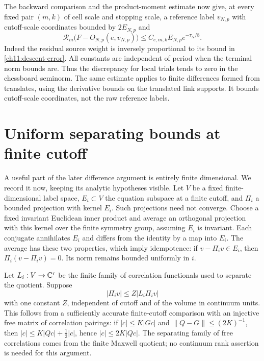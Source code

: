The backward comparison and the product-moment estimate now give, at every fixed
pair $(m,k)$ of cell scale and stopping scale, a reference label $v_{N,p}$ with cutoff-scale
coordinates bounded by $2E_{N,p}$ and
\begin{equation}
 \mathcal R_m\bigl(F-O_{N,p}(e,v_{N,p})\bigr)
       \le C_{e,m,k}E_{N,p}e^{-\tau_N/8}.
 \label{ch11:trial-error}
\end{equation}
Indeed the residual source weight is inversely proportional to its
bound in \eqref{ch11:descent-error}. All constants are independent
of period when the terminal norm bounds are. Thus the discrepancy for local trials tends to zero in the chessboard
seminorm. The same estimate applies to finite differences formed from
translates, using the derivative bounds on the translated link supports.
It bounds cutoff-scale coordinates, not the raw reference labels.

\section{Uniform separating bounds at finite cutoff}
\label{ch11:detectors}

A useful part of the later difference argument is entirely finite
dimensional. We record it now, keeping its analytic hypotheses visible.
Let $V$ be a fixed finite-dimensional label space, $E_i\subset V$
the equation subspace at a finite cutoff, and $\Pi_i$ a bounded
projection with kernel $E_i$. Such projections need not converge.
Choose a fixed invariant Euclidean inner product and average an
orthogonal projection with this kernel over the finite symmetry group,
assuming $E_i$ is invariant. Each conjugate annihilates $E_i$ and differs
from the identity by a map into $E_i$. The average has these two
properties, which imply idempotence: if $v-\Pi_i v\in E_i$, then
$\Pi_i(v-\Pi_i v)=0$. Its norm remains bounded uniformly in $i$.

Let $L_i:V\to\mathbb C^r$ be the finite family of correlation functionals used
to separate the quotient. Suppose
\begin{equation}
 |\Pi_i v|\le Z|L_i\Pi_i v|
 \label{ch11:detector-bound}
\end{equation}
with one constant $Z$, independent of cutoff and of the volume in continuum units.
This follows from a sufficiently accurate finite-cutoff comparison
with an injective free matrix of correlation pairings: if $|c|\le K|Gc|$ and
$\|Q-G\|\le(2K)^{-1}$, then
$|c|\le K|Qc|+\tfrac12|c|$, hence $|c|\le2K|Qc|$.
The separating family of free correlations comes from the finite Maxwell quotient; no
continuum rank assertion is needed for this argument.

